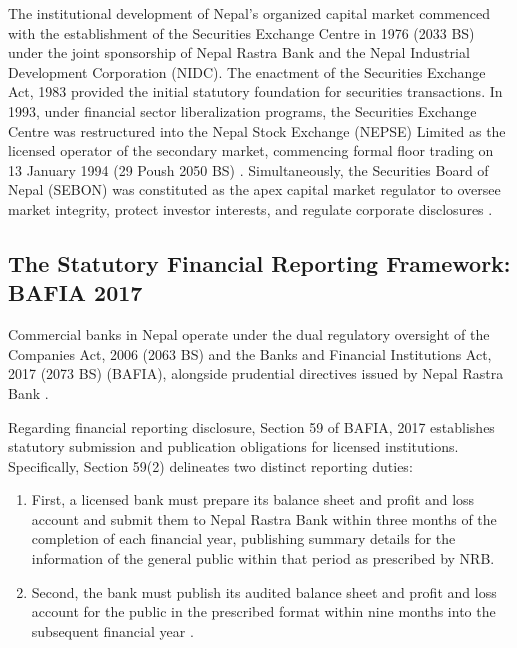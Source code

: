 The institutional development of Nepal's organized capital market commenced with the establishment of the Securities Exchange Centre in 1976 (2033 BS) under the joint sponsorship of Nepal Rastra Bank and the Nepal Industrial Development Corporation (NIDC). The enactment of the Securities Exchange Act, 1983 provided the initial statutory foundation for securities transactions. In 1993, under financial sector liberalization programs, the Securities Exchange Centre was restructured into the Nepal Stock Exchange (NEPSE) Limited as the licensed operator of the secondary market, commencing formal floor trading on 13 January 1994 (29 Poush 2050 BS) \citep{nepse2017}. Simultaneously, the Securities Board of Nepal (SEBON) was constituted as the apex capital market regulator to oversee market integrity, protect investor interests, and regulate corporate disclosures \citep{nepse2017}.

\subsection{The Statutory Financial Reporting Framework: BAFIA 2017}
\label{subsec:bafia_framework}

Commercial banks in Nepal operate under the dual regulatory oversight of the Companies Act, 2006 (2063 BS) and the Banks and Financial Institutions Act, 2017 (2073 BS) (BAFIA), alongside prudential directives issued by Nepal Rastra Bank \citep{companiesact2006,bafia2017}.

Regarding financial reporting disclosure, Section 59 of BAFIA, 2017 establishes statutory submission and publication obligations for licensed institutions. Specifically, Section 59(2) delineates two distinct reporting duties:
\begin{enumerate}
\item First, a licensed bank must prepare its balance sheet and profit and loss account and submit them to Nepal Rastra Bank within three months of the completion of each financial year, publishing summary details for the information of the general public within that period as prescribed by NRB.
\item Second, the bank must publish its audited balance sheet and profit and loss account for the public in the prescribed format within nine months into the subsequent financial year \citep{bafia2017}.
\end{enumerate}


